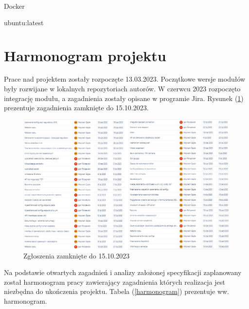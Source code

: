 \documentclass[15pt]{sprawozdanie}
\begin{document}
Docker

ubuntu:latest



\color{black}


\newpage
\section{Harmonogram projektu}

Prace nad projektem zostały rozpoczęte 13.03.2023. Początkowe wersje modułów były rozwijane w lokalnych repozytoriach autorów. W czerwcu 2023 rozpoczęto integrację modułu, a zagadnienia zostały opisane w programie Jira. Rysunek (\ref{zamkniete_jira}) prezentuje zagadnienia zamknięte do 15.10.2023.

\begin{figure}[!h]
\centering
\includegraphics[width=\textwidth]{jira_june_sept.png}
\caption{Zgłoszenia zamknięte do 15.10.2023}
\label{zamkniete_jira}
\end{figure}

Na podstawie otwartych zagadnień i analizy założonej specyfikacji zaplanowany został harmonogram pracy zawierający zagadnienia których realizacja jest niezbędna do ukończenia projektu. Tabela (\ref{harmonogram}) prezentuje ww. harmonogram. 
\end{document}
